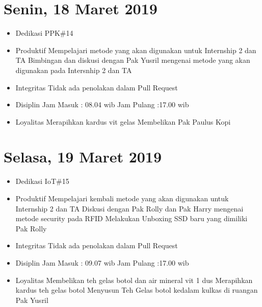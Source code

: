 \section{Senin, 18 Maret 2019}
\begin{itemize}
\item Dedikasi
\subitem PPK\#14
\item Produktif
  \subitem Mempelajari metode yang akan digunakan untuk Internship 2 dan TA
  \subitem Bimbingan dan diskusi dengan Pak Yusril mengenai metode yang akan digunakan pada Intersnhip 2 dan TA
\item Integritas
  \subitem Tidak ada penolakan dalam Pull Request
\item Disiplin
  \subitem Jam Masuk : 08.04 wib
  \subitem Jam Pulang :17.00 wib
\item Loyalitas
  \subitem Merapihkan kardus vit gelas
  \subitem Membelikan Pak Paulus Kopi
\end{itemize}

\section{Selasa, 19 Maret 2019}
\begin{itemize}
\item Dedikasi
\subitem IoT\#15
\item Produktif
  \subitem Mempelajari kembali metode yang akan digunakan untuk Internship 2 dan TA
  \subitem Diskusi dengan Pak Rolly dan Pak Harry mengenai metode security pada RFID
  \subitem Melakukan Unboxing SSD baru yang dimiliki Pak Rolly
\item Integritas
  \subitem Tidak ada penolakan dalam Pull Request
\item Disiplin
  \subitem Jam Masuk : 09.07 wib
  \subitem Jam Pulang :17.00 wib
\item Loyalitas
  \subitem Membelikan teh gelas botol dan air mineral vit 1 dus
  \subitem Merapihkan kardus teh gelas botol
  \subitem Menyusun Teh Gelas botol kedalam kulkas di ruangan Pak Yusril
\end{itemize}

